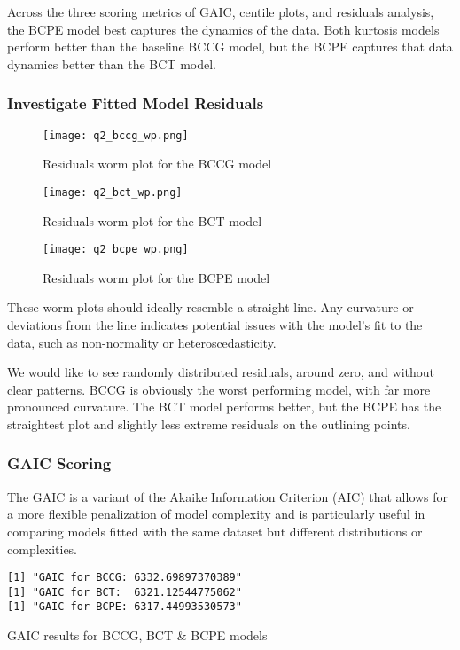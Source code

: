 Across the three scoring metrics of GAIC, centile plots, and residuals analysis, the BCPE model best captures the dynamics of the
data.  Both kurtosis models perform better than the baseline BCCG model, but the BCPE captures that data dynamics better than the
BCT model.

\subsubsection{Investigate Fitted Model Residuals}


\begin{figure}[H]
  \texttt{[image: q2\_bccg\_wp.png]}
  \caption{Residuals worm plot for the BCCG model}
\end{figure}


\begin{figure}[H]
  \texttt{[image: q2\_bct\_wp.png]}
  \caption{Residuals worm plot for the BCT model}
\end{figure}


\begin{figure}[H]
  \texttt{[image: q2\_bcpe\_wp.png]}
  \caption{Residuals worm plot for the BCPE model}
\end{figure}

These worm plots should ideally resemble a straight line. Any curvature or deviations from the line indicates potential
issues with the model's fit to the data, such as non-normality or heteroscedasticity.

We would like to see randomly distributed residuals, around zero, and without clear patterns.  BCCG is obviously the worst
performing model, with far more pronounced curvature.  The BCT model performs better, but the BCPE has the straightest plot
and slightly less extreme residuals on the outlining points.


\subsubsection{GAIC Scoring}

The GAIC is a variant of the Akaike Information Criterion (AIC) that allows for a more flexible penalization of
model complexity and is particularly useful in comparing models fitted with the same dataset but
different distributions or complexities.

\begin{table}[!ht]
\begin{verbatim}
[1] "GAIC for BCCG: 6332.69897370389"
[1] "GAIC for BCT:  6321.12544775062"
[1] "GAIC for BCPE: 6317.44993530573"
\end{verbatim}
\caption {GAIC results for BCCG, BCT \& BCPE models}
\end{table}

